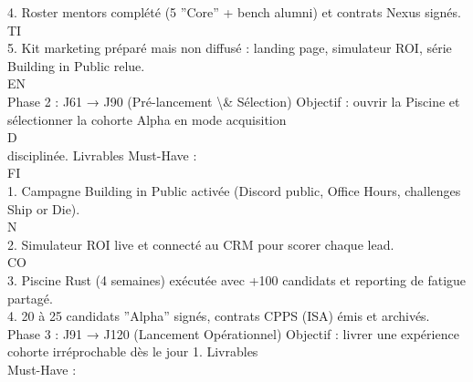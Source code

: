 4. Roster mentors complété (5 ”Core” + bench alumni) et contrats Nexus signés.\\
\vspace{0.5em}
\vspace{0.5em}
\vspace{0.5em}
\vspace{0.5em}
TI\\
5. Kit marketing préparé mais non diffusé : landing page, simulateur ROI, série Building in Public relue.\\
\vspace{0.5em}
\vspace{0.5em}
\vspace{0.5em}
\vspace{0.5em}
EN\\
Phase 2 : J61 → J90 (Pré-lancement \textbackslash{}& Sélection) Objectif : ouvrir la Piscine et sélectionner la cohorte Alpha en mode acquisition\\
\vspace{0.5em}
\vspace{0.5em}
\vspace{0.5em}
\vspace{0.5em}
D\\
disciplinée. Livrables Must-Have :\\
\vspace{0.5em}
\vspace{0.5em}
\vspace{0.5em}
\vspace{0.5em}
FI\\
1. Campagne Building in Public activée (Discord public, Office Hours, challenges Ship or Die).\\
\vspace{0.5em}
N\\
2. Simulateur ROI live et connecté au CRM pour scorer chaque lead.\\
CO\\
3. Piscine Rust (4 semaines) exécutée avec +100 candidats et reporting de fatigue partagé.\\
\vspace{0.5em}
4. 20 à 25 candidats ”Alpha” signés, contrats CPPS (ISA) émis et archivés.\\
\vspace{0.5em}
Phase 3 : J91 → J120 (Lancement Opérationnel)            Objectif : livrer une expérience cohorte irréprochable dès le jour 1. Livrables\\
Must-Have :\\
\vspace{0.5em}
